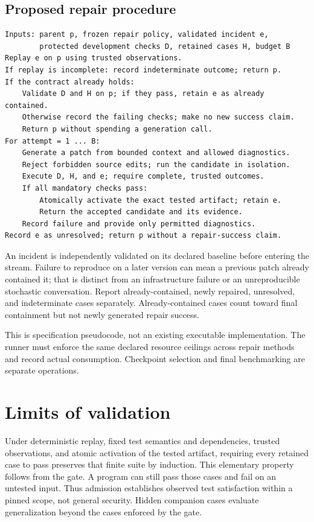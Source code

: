 \documentclass[11pt,a4paper]{article}
\begin{document}
\subsection{Proposed repair procedure}
\noindent\begin{minipage}{\linewidth}
\begin{Verbatim}[fontsize=\small,frame=single,framesep=6pt]
Inputs: parent p, frozen repair policy, validated incident e,
        protected development checks D, retained cases H, budget B
Replay e on p using trusted observations.
If replay is incomplete: record indeterminate outcome; return p.
If the contract already holds:
    Validate D and H on p; if they pass, retain e as already contained.
    Otherwise record the failing checks; make no new success claim.
    Return p without spending a generation call.
For attempt = 1 ... B:
    Generate a patch from bounded context and allowed diagnostics.
    Reject forbidden source edits; run the candidate in isolation.
    Execute D, H, and e; require complete, trusted outcomes.
    If all mandatory checks pass:
        Atomically activate the exact tested artifact; retain e.
        Return the accepted candidate and its evidence.
    Record failure and provide only permitted diagnostics.
Record e as unresolved; return p without a repair-success claim.
\end{Verbatim}
\end{minipage}
An incident is independently validated on its declared baseline before entering the stream. Failure to reproduce on a later version can mean a previous patch already contained it; that is distinct from an infrastructure failure or an unreproducible stochastic conversation. Report already-contained, newly repaired, unresolved, and indeterminate cases separately. Already-contained cases count toward final containment but not newly generated repair success.

This is specification pseudocode, not an existing executable implementation. The runner must enforce the same declared resource ceilings across repair methods and record actual consumption. Checkpoint selection and final benchmarking are separate operations.

\section{Limits of validation}
Under deterministic replay, fixed test semantics and dependencies, trusted observations, and atomic activation of the tested artifact, requiring every retained case to pass preserves that finite suite by induction. This elementary property follows from the gate. A program can still pass those cases and fail on an untested input. Thus admission establishes observed test satisfaction within a pinned scope, not general security. Hidden companion cases evaluate generalization beyond the cases enforced by the gate.
\end{document}

